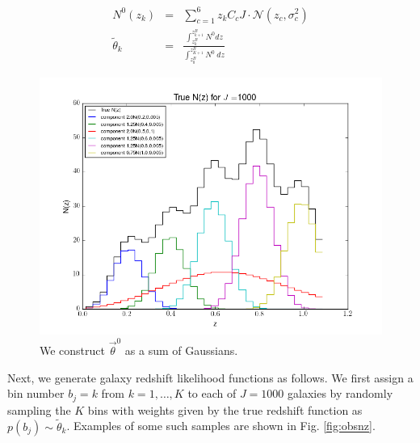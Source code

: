 \documentclass[12pt, onecolumn]{emulateapj}
\newcommand{\textul}{\underline}
\begin{document}
\begin{mathletters}
\begin{eqnarray}
\label{eq:truenz}
N^{0}(z_{k}) &=& \sum_{c=1}^{6}z_{k}C_{c}J\cdot \mathcal{N}(z_{c},\sigma^{2}_{c})\nonumber\\
\tilde{\theta}_{k} &=& \frac{\int_{z_{k}^{B}}^{z_{k+1}^{B}}N^{0} dz}{\int_{z_{0}^{B}}^{z_{K+1}^{B}} N^{0}\ dz}
\end{eqnarray}
\end{mathletters}

\begin{figure}
\label{fig:truenz}
\includegraphics[scale=0.5]{trueNz.png}
\caption{We construct $\vec{\theta}^{0}$ as a sum of Gaussians.}
\end{figure}

Next, we generate galaxy redshift likelihood functions as follows.  We first assign a bin number $b_{j}=k$ from $k=1,\dots,K$ to each of $J=1000$ galaxies by randomly sampling the $K$ bins with weights given by the true redshift function as $p(b_{j})\sim\tilde{\theta}_{k}$.  Examples of some such samples are shown in Fig. \ref{fig:obsnz}.
\end{document}
